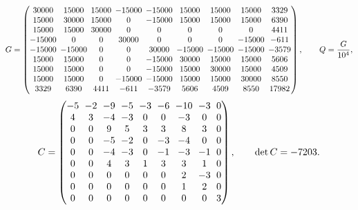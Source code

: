 \begin{equation}\label{eq:gram7203}
\begingroup
\setlength{\arraycolsep}{2.4pt}
G=\begin{pmatrix}
30000&15000&15000&-15000&-15000&15000&15000&15000&3329\\
15000&30000&15000&0&-15000&15000&15000&15000&6390\\
15000&15000&30000&0&0&0&0&0&4411\\
-15000&0&0&30000&0&0&0&-15000&-611\\
-15000&-15000&0&0&30000&-15000&-15000&-15000&-3579\\
15000&15000&0&0&-15000&30000&15000&15000&5606\\
15000&15000&0&0&-15000&15000&30000&15000&4509\\
15000&15000&0&-15000&-15000&15000&15000&30000&8550\\
3329&6390&4411&-611&-3579&5606&4509&8550&17982
\end{pmatrix},\qquad Q=\frac{G}{10^{4}},
\endgroup
\end{equation}
\begin{equation}\label{eq:sub7203}
\begingroup
\setlength{\arraycolsep}{3.0pt}
C=\begin{pmatrix}
-5&-2&-9&-5&-3&-6&-10&-3&0\\
4&3&-4&-3&0&0&-3&0&0\\
0&0&9&5&3&3&8&3&0\\
0&0&-5&-2&0&-3&-4&0&0\\
0&0&-4&-3&0&-1&-3&-1&0\\
0&0&4&3&1&3&3&1&0\\
0&0&0&0&0&0&2&-3&0\\
0&0&0&0&0&0&1&2&0\\
0&0&0&0&0&0&0&0&3
\end{pmatrix},\qquad \det C=-7203 .
\endgroup
\end{equation}

